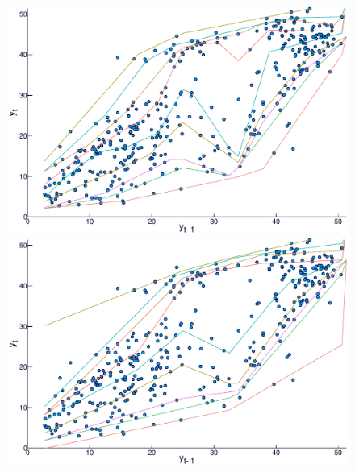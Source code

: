 \begin{figure}[htp]
\begin{minipage}[t]{0.4\linewidth}
\begin{minipage}[b]{\linewidth}
      \centering     \includegraphics[width=\textwidth]{Images/icaraizinho-crossing-1}
     \end{minipage}
  \end{minipage}
  \begin{minipage}[t]{0.4\linewidth}
    \centering
    \begin{minipage}[t]{\linewidth}
      \centering     \includegraphics[width=\textwidth]{Images/icaraizinho-crossing-3}
    \end{minipage}
    \begin{minipage}[b]{\linewidth}

\end{minipage}
\end{minipage}
\end{figure}
